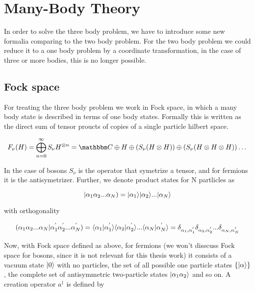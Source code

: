 \section{Many-Body Theory}
In order to solve the three body problem, we have to introduce some new formalia comparing to the two body problem. For the two body problem we could reduce it to a one body problem by a coordinate transformation, in the case of three or more bodies, this is no longer possible. 

\subsection{Fock space}
For treating the three body problem we work in Fock space, in which a many body state is described in terms of one body states. Formally this is written as the direct sum of tensor proucts of copies of a single particle hilbert space. 

\begin{equation}
F_{\nu}(H) =
\bigoplus_{n=0}^\inf S_{\nu}H^{\otimes n} =
\C \oplus H \oplus(S_{\nu}(H \otimes H)) \oplus (S_{\nu}(H \otimes H \otimes H)) \dots
\end{equation}

In the case of bosons $S_{\nu}$ is the operator that symetrize a tensor, and for fermions it is the antisymetrizer.
Further, we denote product states for N partlicles as

\begin{equation}
|\alpha_1 \alpha_2 ... \alpha_{N}) =
\ket{\alpha_1} \ket{\alpha_2}...\ket{\alpha_{N}}
\end{equation}

with orthogonality

\begin{equation}
(\alpha_1 \alpha_2 ... \alpha_N | \alpha_1^{'} \alpha_2^{'} ... \alpha_N^{'}) =
\langle\alpha_1| \alpha_1^{'}\rangle\langle\alpha_2|\alpha_2^{'}\rangle...\langle\alpha_N|\alpha_N^{'}\rangle = \delta_{\alpha_1,\alpha_1^{'}} \delta_{\alpha_2,\alpha_2^{'}}...\delta_{\alpha_N,\alpha_N^{'}}
\end{equation}

Now, with Fock space defined as above, for fermions (we won't disscuss Fock space for bosons, since it is not relevant for this thesis work) it consists of a vacuum state $\ket{0}$ with no particles, the set of all possible one particle states $\{ \ket{\alpha} \} $, the complete set of antisymmetric two-particle states $\ket{\alpha_1 \alpha_2}$ and so on. A creation operator $a^{\dagger}$ is defined by

